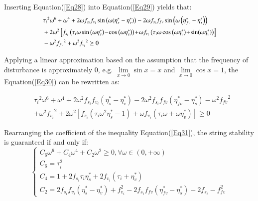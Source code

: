 \documentclass[journal]{IEEEtran}
\begin{document}
Inserting Equation(\ref{Eq28}) into Equation(\ref{Eq29}) yields that:
\begin{equation}
  \begin{small}
    \begin{aligned}
       & {\tau_i}^2\omega^6+\omega^4+2\omega f_{s_i}f_{v_i}\sin{\left(\omega(\eta_s^\ast-\eta_v^\ast)\right)}-2\omega f_{s_i}f_{fv}\sin{\left(\omega\left(\eta_{fv}^\ast-\eta_s^\ast\right)\right)}                                                           \\
       & +2\omega^2\left[f_{s_i}\left(\tau_i\omega \sin\left(\omega\eta_s^\ast\right)\! -\! \cos \left(\omega\eta_s^\ast\right)\right)\! +\! \omega f_{v_i}\left(\tau_i\omega \cos \left(\omega\eta_v^\ast\right)\! +\! \sin(\omega\eta_v^\ast)\right)\right] \\
       & -\omega^2{f_{fv}}^2 +\omega^2{f_{v_i}}^2    \geq0
    \end{aligned}
  \end{small}
  \label{Eq30}
\end{equation}

Applying a linear approximation based on the assumption that the frequency of disturbance is approximately 0, e.g. $\mathop {lim}\limits_{x \to 0} \sin x = x$ and $\mathop {lim}\limits_{x \to 0} \cos x = 1$, the Equation(\ref{Eq30}) can be rewritten as:

\begin{equation}
  \begin{aligned}
     & {\tau_i}^2\omega^6+\omega^4+2\omega^2f_{s_i}f_{v_i}\left(\eta_s^\ast-\eta_v^\ast\right)-2\omega^2f_{s_i}f_{fv}\left(\eta_{fv}^\ast-\eta_s^\ast\right)-\omega^2{f_{fv}}^2 \\
     & +\omega^2{f_{v_i}}^2+2\omega^2\left[f_{s_i}\left(\tau_i\omega^2\eta_s^\ast-1\right)+\omega f_{v_i}\left(\tau_i\omega+\omega\eta_v^\ast\right)\right]\geq0
  \end{aligned}
  \label{Eq31}
\end{equation}

Rearranging the coefficient of the inequality Equation(\ref{Eq31}), the string stability is guaranteed if and only if:
\begin{equation}
  \left\{\begin{array}{l}
    C_{6} \omega^{6}+C_{4} \omega^{4}+C_{2} \omega^{2} \geq 0, \forall \omega \in(0,+\infty) \\
    C_{6}=\tau_{i}^{2}                                                                       \\
    C_{4}=1+2 f_{s_{i}} \tau_{i} \eta_{s}^{*}+2 f_{v_{i}}\left(\tau_{i}+\eta_{v}^{*}\right)  \\
    C_{2}=2 f_{s_{i}} f_{v_{i}}\left(\eta_{s}^{*}-\eta_{v}^{*}\right)+f_{v_{i}}^{2}-2 f_{s_{i}} f_{f v}\left(\eta_{f v}^{*}-\eta_{s}^{*}\right)-2 f_{s_{i}}-f_{f v}^{2}
  \end{array}\right.
  \label{Eq32}
\end{equation}
\end{document}
